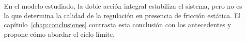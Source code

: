 En el modelo estudiado, la doble acción integral estabiliza el sistema, pero no es la que determina la calidad de la regulación en presencia de fricción estática. El capítulo~\ref{chap:conclusiones} contrasta esta conclusión con los antecedentes y propone cómo abordar el ciclo límite.

\FloatBarrier
